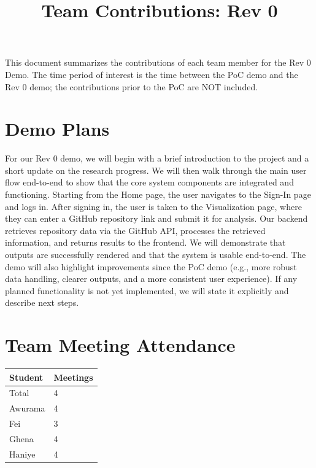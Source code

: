 \documentclass{article}
\title{Team Contributions: Rev 0\\\progname}
\author{\authname}
\date{}
\begin{document}
\maketitle

This document summarizes the contributions of each team member for the Rev 0
Demo.  The time period of interest is the time between the PoC demo and the Rev
0 demo; the contributions prior to the PoC are NOT included.

\section{Demo Plans}

For our Rev 0 demo, we will begin with a brief introduction
to the project and a short update on the research progress.
We will then walk through the main user flow end-to-end to
show that the core system components are integrated and
functioning. Starting from the Home page, the user navigates
to the Sign-In page and logs in. After signing in, the user
is taken to the Visualization page, where they can enter a
GitHub repository link and submit it for analysis. Our backend
retrieves repository data via the GitHub API, processes the
retrieved information, and returns results to the frontend.
We will demonstrate that outputs are successfully rendered
and that the system is usable end-to-end. The demo will also
highlight improvements since the PoC demo (e.g., more robust
data handling, clearer outputs, and a more consistent user
experience). If any planned functionality is not yet
implemented, we will state it explicitly and describe next
steps.

\section{Team Meeting Attendance}


\begin{table}[H]
\centering
\begin{tabular}{ll}
\toprule
\textbf{Student} & \textbf{Meetings}\\
\midrule
Total & 4\\
Awurama & 4\\
Fei & 3\\
Ghena & 4\\
Haniye & 4\\
\bottomrule
\end{tabular}
\end{table}
\end{document}
